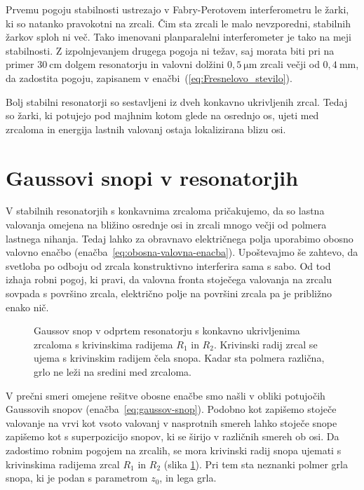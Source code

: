 Prvemu pogoju stabilnosti ustrezajo v Fabry-Perotovem interferometru
le žarki, ki so natanko pravokotni na zrcali. Čim sta zrcali le
malo nevzporedni, stabilnih žarkov sploh ni več. Tako imenovani planparalelni 
interferometer je tako na meji stabilnosti. Z izpolnjevanjem drugega
pogoja ni težav, saj morata biti pri na primer $30~\si{\centi\metre}$ dolgem resonatorju in 
valovni dolžini $0,5~\si{\micro\metre}$ zrcali večji od $0,4~\si{\milli\metre}$, da zadostita pogoju, 
zapisanem v enačbi~(\ref{eq:Fresnelovo_stevilo}).

Bolj stabilni resonatorji so sestavljeni iz dveh konkavno ukrivljenih
zrcal. Tedaj so žarki, ki potujejo pod majhnim kotom glede na osrednjo os, ujeti
med zrcaloma in energija lastnih valovanj ostaja lokalizirana blizu
osi.

\section{Gaussovi snopi v resonatorjih}
V stabilnih resonatorjih s konkavnima zrcaloma pričakujemo, da so
lastna valovanja omejena na bližino osrednje osi in zrcali mnogo 
večji od polmera lastnega nihanja. Tedaj lahko za obravnavo
električnega polja uporabimo obosno valovno 
enačbo (enačba~\ref{eq:obosna-valovna-enacba}). Upoštevajmo še zahtevo,
da svetloba po odboju od zrcala konstruktivno interferira sama s sabo.
Od tod izhaja robni pogoj, ki pravi, da valovna fronta stoječega valovanja na 
zrcalu sovpada s površino zrcala, električno polje na površini zrcala
pa je približno enako nič.

\begin{figure}[h]
\centering
\def\svgwidth{100truemm} 

\caption{Gaussov snop v odprtem resonatorju s konkavno ukrivljenima zrcaloma
s krivinskima radijema $R_1$ in $R_2$. 
Krivinski radij zrcal se ujema s krivinskim radijem čela snopa. Kadar sta polmera
različna, grlo ne leži na sredini med zrcaloma.}
\label{fig:Gaussov-snop-v-resonatorju}
\end{figure}

V prečni smeri omejene rešitve obosne enačbe smo našli v obliki potujočih
Gaussovih snopov (enačba~\ref{eq:gaussov-snop}). 
Podobno kot zapišemo stoječe valovanje na vrvi kot
vsoto valovanj v nasprotnih smereh
lahko stoječe snope zapišemo kot s superpozicijo snopov, ki se širijo v različnih smereh ob osi. 
Da zadostimo robnim pogojem na zrcalih, se mora krivinski radij snopa ujemati s
krivinskima radijema zrcal $R_{1}$ in $R_{2}$ (slika \ref{fig:Gaussov-snop-v-resonatorju}).
Pri tem sta neznanki polmer grla snopa, ki je podan s parametrom $z_{0}$,
in lega grla. 

